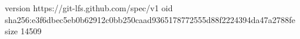 version https://git-lfs.github.com/spec/v1
oid sha256:e3f6dbec5eb0b62912c0bb250caad9365178772555d88f2224394da47a2788fe
size 14509
